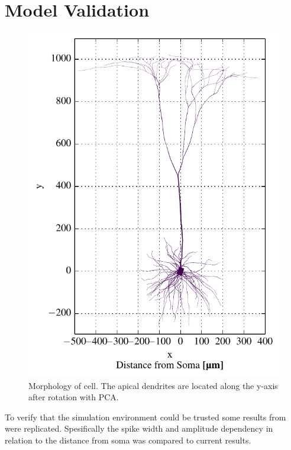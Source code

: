 \documentclass[altfont, fleqn]{uiophd}
\begin{document}
\section{Model Validation}
\begin{figure}
    \vspace{-20pt}
    \begin{center}
        \includegraphics[width=\linewidth]{images/4_1/morph_xy_up.pdf}
        \vspace{-20pt}
        \caption{%
            Morphology of \textcite{mainen_influence_1996} cell. 
            The apical dendrites are located along the y-axis after rotation
            with PCA.}
        \label{fig:4_1_morph}
        \vspace{-10pt}
    \end{center}
\end{figure}
To verify that the simulation environment could be trusted 
some results from 
\textcite{pettersen_amplitude_2008} were replicated.
Spesifically the spike width and amplitude dependency in relation to 
the distance from soma was compared to current results. 
\end{document}
